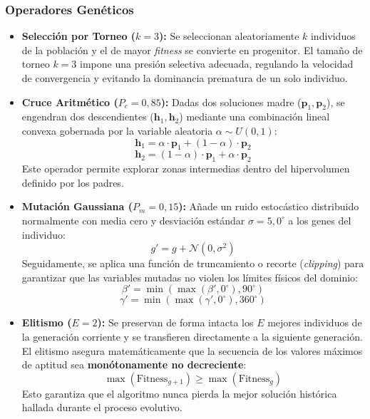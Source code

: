 \documentclass[12pt, a4paper, twocolumn]{article}
\begin{document}
\subsubsection{Operadores Genéticos}
\begin{itemize}
    \item \textbf{Selección por Torneo ($k=3$):} Se seleccionan aleatoriamente $k$ individuos de la población y el de mayor \textit{fitness} se convierte en progenitor. El tamaño de torneo $k=3$ impone una presión selectiva adecuada, regulando la velocidad de convergencia y evitando la dominancia prematura de un solo individuo.
    \item \textbf{Cruce Aritmético ($P_c = 0,85$):} Dadas dos soluciones madre ($\mathbf{p}_1, \mathbf{p}_2$), se engendran dos descendientes ($\mathbf{h}_1, \mathbf{h}_2$) mediante una combinación lineal convexa gobernada por la variable aleatoria $\alpha \sim U(0,1)$:
    \begin{equation}
        \mathbf{h}_1 = \alpha \cdot \mathbf{p}_1 + (1-\alpha) \cdot \mathbf{p}_2
    \end{equation}
    \begin{equation}
        \mathbf{h}_2 = (1-\alpha) \cdot \mathbf{p}_1 + \alpha \cdot \mathbf{p}_2
    \end{equation}
    Este operador permite explorar zonas intermedias dentro del hipervolumen definido por los padres.
    \item \textbf{Mutación Gaussiana ($P_m = 0,15$):} Añade un ruido estocástico distribuido normalmente con media cero y desviación estándar $\sigma = 5,0^\circ$ a los genes del individuo:
    \begin{equation}
        g' = g + \mathcal{N}(0, \sigma^2)
    \end{equation}
    Seguidamente, se aplica una función de truncamiento o recorte (\textit{clipping}) para garantizar que las variables mutadas no violen los límites físicos del dominio:
    \begin{equation}
        \beta' = \min(\max(\beta', 0^\circ), 90^\circ)
    \end{equation}
    \begin{equation}
        \gamma' = \min(\max(\gamma', 0^\circ), 360^\circ)
    \end{equation}
    \item \textbf{Elitismo ($E=2$):} Se preservan de forma intacta los $E$ mejores individuos de la generación corriente y se transfieren directamente a la siguiente generación. El elitismo asegura matemáticamente que la secuencia de los valores máximos de aptitud sea \textbf{monótonamente no decreciente}:
    \begin{equation}
        \max(\text{Fitness}_{g+1}) \ge \max(\text{Fitness}_g)
    \end{equation}
    Esto garantiza que el algoritmo nunca pierda la mejor solución histórica hallada durante el proceso evolutivo.
\end{itemize}
\end{document}
